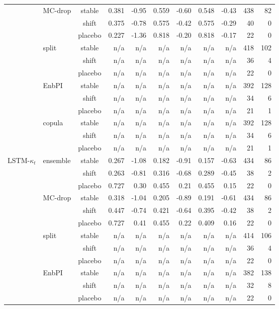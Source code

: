 {\begin{longtable}{@{}llcrrrrrrrr@{}}
 & MC-drop & stable & 0.381 & -0.95 & 0.559 & -0.60 & 0.548 & -0.43 & 438 & 82 \\
 &  & shift & 0.375 & -0.78 & 0.575 & -0.42 & 0.575 & -0.29 & 40 & 0 \\
 &  & placebo & 0.227 & -1.36 & 0.818 & -0.20 & 0.818 & -0.17 & 22 & 0 \\
 & split & stable & n/a & n/a & n/a & n/a & n/a & n/a & 418 & 102 \\
 &  & shift & n/a & n/a & n/a & n/a & n/a & n/a & 36 & 4 \\
 &  & placebo & n/a & n/a & n/a & n/a & n/a & n/a & 22 & 0 \\
 & EnbPI & stable & n/a & n/a & n/a & n/a & n/a & n/a & 392 & 128 \\
 &  & shift & n/a & n/a & n/a & n/a & n/a & n/a & 34 & 6 \\
 &  & placebo & n/a & n/a & n/a & n/a & n/a & n/a & 21 & 1 \\
 & copula & stable & n/a & n/a & n/a & n/a & n/a & n/a & 392 & 128 \\
 &  & shift & n/a & n/a & n/a & n/a & n/a & n/a & 34 & 6 \\
 &  & placebo & n/a & n/a & n/a & n/a & n/a & n/a & 21 & 1 \\
\addlinespace[2pt]
LSTM-$\kappa_t$ & ensemble & stable & 0.267 & -1.08 & 0.182 & -0.91 & 0.157 & -0.63 & 434 & 86 \\
 &  & shift & 0.263 & -0.81 & 0.316 & -0.68 & 0.289 & -0.45 & 38 & 2 \\
 &  & placebo & 0.727 & 0.30 & 0.455 & 0.21 & 0.455 & 0.15 & 22 & 0 \\
 & MC-drop & stable & 0.318 & -1.04 & 0.205 & -0.89 & 0.191 & -0.61 & 434 & 86 \\
 &  & shift & 0.447 & -0.74 & 0.421 & -0.64 & 0.395 & -0.42 & 38 & 2 \\
 &  & placebo & 0.727 & 0.41 & 0.455 & 0.22 & 0.409 & 0.16 & 22 & 0 \\
 & split & stable & n/a & n/a & n/a & n/a & n/a & n/a & 414 & 106 \\
 &  & shift & n/a & n/a & n/a & n/a & n/a & n/a & 36 & 4 \\
 &  & placebo & n/a & n/a & n/a & n/a & n/a & n/a & 22 & 0 \\
 & EnbPI & stable & n/a & n/a & n/a & n/a & n/a & n/a & 382 & 138 \\
 &  & shift & n/a & n/a & n/a & n/a & n/a & n/a & 32 & 8 \\
 &  & placebo & n/a & n/a & n/a & n/a & n/a & n/a & 22 & 0 \\

\end{longtable}}
